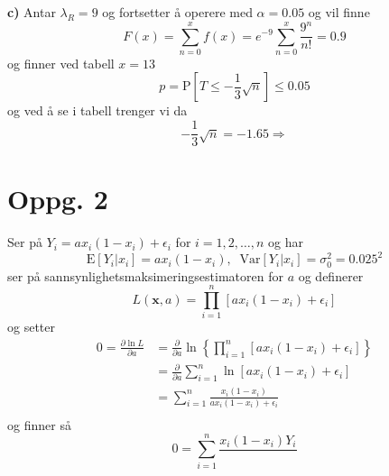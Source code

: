 \documentclass{report}
\newcommand{\bbrack}[1]{\left[ #1 \right]}
\newcommand{\cbrack}[1]{\left\lbrace #1 \right\rbrace}
\newcommand{\Var}[1]{\text{Var} \bbrack{ #1 }}
\newcommand{\fvv}[1]{\text{E} \bbrack{ #1 }}
\newcommand{\Prob}[1]{\text{P} \bbrack{ #1 }}
\begin{document}
\textbf{c)}
Antar $\lambda_{R} = 9$ og fortsetter å operere med $\alpha = 0.05$ og vil finne
\begin{equation}
  \label{eq:13}
  F(x) = \sum_{n=0}^{x} f(x) = e^{-9} \sum_{n=0}^{x} \frac{9^{n}}{n!} = 0.9
\end{equation}
og finner ved tabell $x = 13$
\begin{equation}
  \label{eq:11}
  p = \Prob{ T \leq -\frac{1}{3}\sqrt{n} } \leq 0.05
\end{equation}
og ved å se i tabell trenger vi da
\begin{equation}
  \label{eq:12}
  -\frac{1}{3}\sqrt{n} = -1.65 \Rightarrow
\end{equation}



\section*{Oppg. 2}
Ser på $Y_{i} = ax_{i}(1-x_{i}) + \epsilon_{i}$ for $i = 1, 2, \dots, n$ og har
\begin{equation}
  \label{eq:14}
  \fvv{ Y_{i} | x_{i} } = ax_{i} (1-x_{i}), \;\; \Var{ Y_{i} | x_{i} } = \sigma_{0}^{2} = 0.025^{2}
\end{equation}
ser på sannsynlighetsmaksimeringsestimatoren for $a$ og definerer
\begin{equation}
  \label{eq:15}
  L(\mathbf{x}, a) = \prod_{i=1}^{n} \bbrack{ ax_{i} (1-x_{i}) + \epsilon_{i} }
\end{equation}
og setter
\begin{equation}
  \label{eq:16}
  \begin{split}
    0 = \frac{\partial \ln L}{\partial a}
    &= \frac{\partial}{\partial a} \ln \cbrack{ \prod_{i=1}^{n} \bbrack{ ax_{i} (1-x_{i}) + \epsilon_{i} } } \\
    &= \frac{\partial}{\partial a} \sum_{i=1}^{n}\ln \bbrack{ ax_{i}(1-x_{i}) + \epsilon_{i} } \\
    &= \sum_{i=1}^{n} \frac{x_{i}(1-x_{i})}{ax_{i}(1-x_{i}) + \epsilon_{i}} \\
  \end{split}
\end{equation}
og finner så
\begin{equation}
  \label{eq:17}
  0 = \sum_{i=1}^{n} \frac{x_{i}(1-x_{i})Y_{i}}{}
\end{equation}
\end{document}
